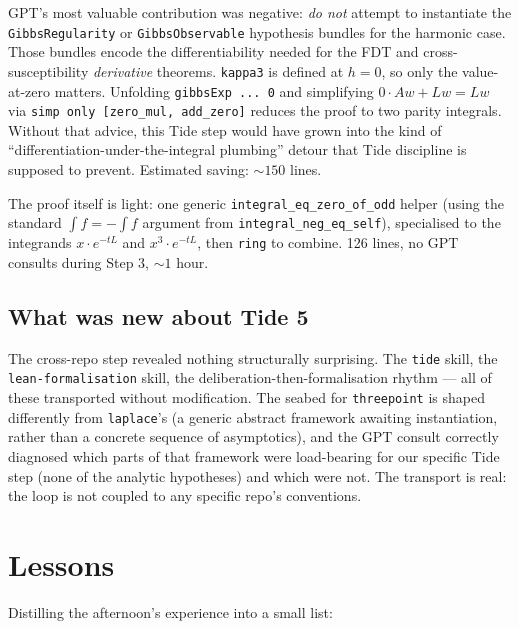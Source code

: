 \documentclass[11pt]{article}
\begin{document}
GPT's most valuable contribution was negative: \emph{do not} attempt
to instantiate the \texttt{GibbsRegularity} or \texttt{GibbsObservable}
hypothesis bundles for the harmonic case. Those bundles encode the
differentiability needed for the FDT and cross-susceptibility
\emph{derivative} theorems. \texttt{kappa3} is defined at $h = 0$, so
only the value-at-zero matters. Unfolding \texttt{gibbsExp ... 0} and
simplifying $0 \cdot A w + L w = L w$ via \texttt{simp only [zero\_mul,
add\_zero]} reduces the proof to two parity integrals. Without that
advice, this Tide step would have grown into the kind of
``differentiation-under-the-integral plumbing'' detour that Tide
discipline is supposed to prevent. Estimated saving: $\sim 150$ lines.

The proof itself is light: one generic
\texttt{integral\_eq\_zero\_of\_odd} helper (using the standard $\int f
= -\int f$ argument from \texttt{integral\_neg\_eq\_self}), specialised
to the integrands $x \cdot e^{-tL}$ and $x^3 \cdot e^{-tL}$, then
\texttt{ring} to combine. 126 lines, no GPT consults during Step 3,
$\sim 1$ hour.

\subsection*{What was new about Tide 5}

The cross-repo step revealed nothing structurally surprising. The
\texttt{tide} skill, the \texttt{lean-formalisation} skill, the
deliberation-then-formalisation rhythm --- all of these transported
without modification. The seabed for \texttt{threepoint} is shaped
differently from \texttt{laplace}'s (a generic abstract framework
awaiting instantiation, rather than a concrete sequence of
asymptotics), and the GPT consult correctly diagnosed which parts of
that framework were load-bearing for our specific Tide step (none of
the analytic hypotheses) and which were not. The transport is real:
the loop is not coupled to any specific repo's conventions.

\section{Lessons}

Distilling the afternoon's experience into a small list:
\end{document}
